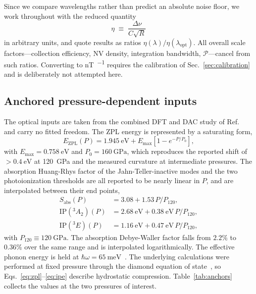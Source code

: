 \documentclass[preprint,12pt]{elsarticle}
\newcommand{\gsA}{\ensuremath{^{3}\!A_{2}}}
\newcommand{\esE}{\ensuremath{^{3}\!E}}
\newcommand{\lopt}{\ensuremath{\lambda_{\mathrm{opt}}}}
\begin{document}
Since we compare wavelengths rather than predict an absolute noise floor, we work
throughout with the reduced quantity
\begin{equation}
  \eta \;\equiv\; \frac{\Delta\nu}{C\sqrt{R}}
\end{equation}
in arbitrary units, and quote results as ratios $\eta(\lambda)/\eta(\lopt)$. All
overall scale factors---collection efficiency, NV density, integration
bandwidth, $\mathcal{P}$---cancel from such ratios. Converting to
\si{\nano\tesla\per\sqrt{\hertz}} requires the calibration of
Sec.~\ref{sec:calibration} and is deliberately not attempted here.

\subsection{Anchored pressure-dependent inputs}
\label{sec:model:anchors}

The optical inputs are taken from the combined DFT and DAC study of
Ref.~\cite{Ho2026} and carry no fitted freedom. The ZPL energy is represented by
a saturating form,
\begin{equation}
  E_{\mathrm{ZPL}}(P) = \SI{1.945}{\electronvolt}
  + E_{\max}\left[1 - e^{-P/P_0}\right],
  \label{eq:zpl}
\end{equation}
with $E_{\max} = \SI{0.758}{\electronvolt}$ and $P_0 = \SI{160}{\giga\pascal}$,
which reproduces the reported shift of $>\SI{0.4}{\electronvolt}$ at
\SI{120}{\giga\pascal} and the measured curvature at intermediate pressures. The
absorption Huang-Rhys factor of the Jahn-Teller-inactive modes and the two
photoionization thresholds are all reported to be nearly linear in $P$, and are
interpolated between their end points,
\begin{align}
  S_{\mathrm{abs}}(P) &= 3.08 + 1.53\,P/P_{120},
  \label{eq:sabs}\\
  \mathrm{IP}(\gsA)(P) &= \SI{2.68}{\electronvolt}
    + \SI{0.38}{\electronvolt}\,P/P_{120},
  \label{eq:ipa2}\\
  \mathrm{IP}(\esE)(P) &= \SI{1.16}{\electronvolt}
    + \SI{0.47}{\electronvolt}\,P/P_{120},
  \label{eq:ipe}
\end{align}
with $P_{120} \equiv \SI{120}{\giga\pascal}$. The absorption Debye-Waller factor
falls from $2.2\%$ to $0.36\%$ over the same range and is interpolated
logarithmically. The effective phonon energy is held at $\hbar\omega =
\SI{65}{\milli\electronvolt}$~\cite{Kehayias2013}. The underlying calculations
were performed at fixed pressure through the diamond equation of
state~\cite{Occelli2003}, so Eqs.~\eqref{eq:zpl}--\eqref{eq:ipe} describe
hydrostatic compression. Table~\ref{tab:anchors}
collects the values at the two pressures of interest.
\end{document}

